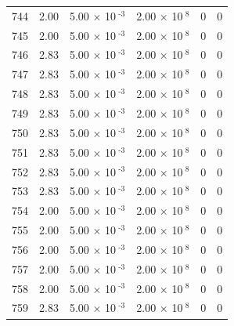 \documentclass[a4paper,11pt]{article}
\begin{document}
\begin{center}
\begin{longtable}{|R{1.5cm}|R{2.4cm}|R{2.4cm}|R{2.4cm}|R{2.4cm}|R{2.4cm}|}
  744 &   2.00  &         5.00 $\times$ 10$^{\text{          -3}}$  &         2.00 $\times$ 10$^{\text{           8}}$  & 0  & 0 \\
  745 &   2.00  &         5.00 $\times$ 10$^{\text{          -3}}$  &         2.00 $\times$ 10$^{\text{           8}}$  & 0  & 0 \\
  746 &   2.83  &         5.00 $\times$ 10$^{\text{          -3}}$  &         2.00 $\times$ 10$^{\text{           8}}$  & 0  & 0 \\
  747 &   2.83  &         5.00 $\times$ 10$^{\text{          -3}}$  &         2.00 $\times$ 10$^{\text{           8}}$  & 0  & 0 \\
  748 &   2.83  &         5.00 $\times$ 10$^{\text{          -3}}$  &         2.00 $\times$ 10$^{\text{           8}}$  & 0  & 0 \\
  749 &   2.83  &         5.00 $\times$ 10$^{\text{          -3}}$  &         2.00 $\times$ 10$^{\text{           8}}$  & 0  & 0 \\
  750 &   2.83  &         5.00 $\times$ 10$^{\text{          -3}}$  &         2.00 $\times$ 10$^{\text{           8}}$  & 0  & 0 \\
  751 &   2.83  &         5.00 $\times$ 10$^{\text{          -3}}$  &         2.00 $\times$ 10$^{\text{           8}}$  & 0  & 0 \\
  752 &   2.83  &         5.00 $\times$ 10$^{\text{          -3}}$  &         2.00 $\times$ 10$^{\text{           8}}$  & 0  & 0 \\
  753 &   2.83  &         5.00 $\times$ 10$^{\text{          -3}}$  &         2.00 $\times$ 10$^{\text{           8}}$  & 0  & 0 \\
  754 &   2.00  &         5.00 $\times$ 10$^{\text{          -3}}$  &         2.00 $\times$ 10$^{\text{           8}}$  & 0  & 0 \\
  755 &   2.00  &         5.00 $\times$ 10$^{\text{          -3}}$  &         2.00 $\times$ 10$^{\text{           8}}$  & 0  & 0 \\
  756 &   2.00  &         5.00 $\times$ 10$^{\text{          -3}}$  &         2.00 $\times$ 10$^{\text{           8}}$  & 0  & 0 \\
  757 &   2.00  &         5.00 $\times$ 10$^{\text{          -3}}$  &         2.00 $\times$ 10$^{\text{           8}}$  & 0  & 0 \\
  758 &   2.00  &         5.00 $\times$ 10$^{\text{          -3}}$  &         2.00 $\times$ 10$^{\text{           8}}$  & 0  & 0 \\
  759 &   2.83  &         5.00 $\times$ 10$^{\text{          -3}}$  &         2.00 $\times$ 10$^{\text{           8}}$  & 0  & 0 \\

\end{longtable}
\end{center}
\end{document}
